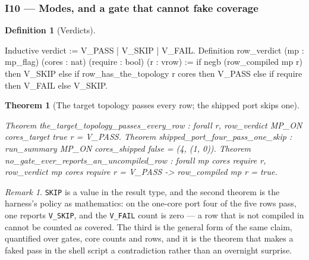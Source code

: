 \documentclass[10pt,journal,compsoc,twocolumn]{article}
\newtheorem{theorem}{Theorem}[section]
\theoremstyle{definition}
\newtheorem{definition}{Definition}[section]
\theoremstyle{remark}
\newtheorem{remark}{Remark}[section]
\theoremstyle{plain}
\newcommand{\ctr}[1]{\texttt{#1}}
\begin{document}
\subsubsection*{I10 --- Modes, and a gate that cannot fake coverage}
\begin{definition}[Verdicts]
\begin{coc}
Inductive verdict := V_PASS | V_SKIP | V_FAIL.
Definition row_verdict (mp : mp_flag) (cores : nat) (require : bool) (r : vrow) :=
  if negb (row_compiled mp r) then V_SKIP
  else if row_has_the_topology r cores then V_PASS
       else if require then V_FAIL else V_SKIP.
\end{coc}\end{definition}
\begin{theorem}[The target topology passes every row; the shipped port skips one]
\begin{coc}
Theorem the_target_topology_passes_every_row :
  forall r, row_verdict MP_ON cores_target true r = V_PASS.
Theorem shipped_port_four_pass_one_skip : run_summary MP_ON cores_shipped false
  = (4, (1, 0)).
Theorem no_gate_ever_reports_an_uncompiled_row : forall mp cores require r,
  row_verdict mp cores require r = V_PASS -> row_compiled mp r = true.
\end{coc}\end{theorem}
\begin{remark}
\ctr{SKIP} is a value in the result type, and the second theorem is the harness's
policy as mathematics: on the one-core port four of the five rows pass, one
reports \ctr{V\_SKIP}, and the \ctr{V\_FAIL} count is zero --- a row that is not
compiled in cannot be counted as covered. The third is the general form of the
same claim, quantified over gates, core counts and rows, and it is the theorem
that makes a faked pass in the shell script a contradiction rather than an
overnight surprise.
\end{remark}
\end{document}

